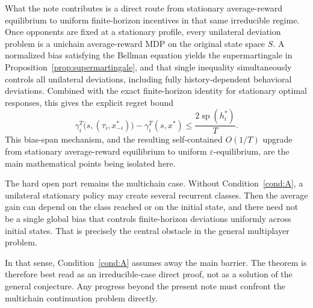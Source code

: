\documentclass[11pt]{article}
\theoremstyle{definition}
\newcommand{\1}{\mathbf{1}}
\DeclareMathOperator{\spn}{sp}
\begin{document}
What the note contributes is a direct route from stationary average-reward equilibrium to uniform finite-horizon incentives in that same irreducible regime. Once opponents are fixed at a stationary profile, every unilateral deviation problem is a unichain average-reward MDP on the original state space $S$. A normalized bias satisfying the Bellman equation yields the supermartingale in Proposition~\ref{prop:supermartingale}, and that single inequality simultaneously controls all unilateral deviations, including fully history-dependent behavioral deviations. Combined with the exact finite-horizon identity for stationary optimal responses, this gives the explicit regret bound
\[
\gamma_i^T\bigl(s,(\tau_i,x_{-i}^*)\bigr)-\gamma_i^T(s,x^*)\le \frac{2\spn(h_i^*)}{T}.
\]
This bias-span mechanism, and the resulting self-contained $O(1/T)$ upgrade from stationary average-reward equilibrium to uniform $\varepsilon$-equilibrium, are the main mathematical points being isolated here.

The hard open part remains the multichain case. Without Condition~\ref{cond:A}, a unilateral stationary policy may create several recurrent classes. Then the average gain can depend on the class reached or on the initial state, and there need not be a single global bias that controls finite-horizon deviations uniformly across initial states. That is precisely the central obstacle in the general multiplayer problem.

In that sense, Condition~\ref{cond:A} assumes away the main barrier. The theorem is therefore best read as an irreducible-case direct proof, not as a solution of the general conjecture. Any progress beyond the present note must confront the multichain continuation problem directly.
\end{document}
